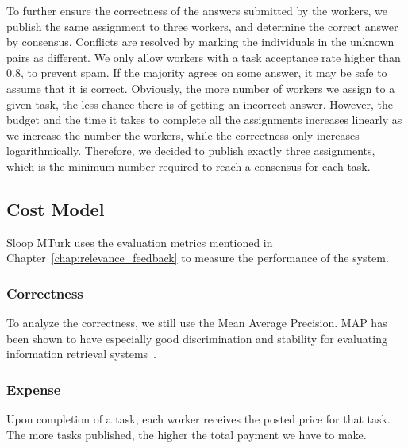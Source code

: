 To further ensure the correctness of the answers submitted by the workers, we
publish the same assignment to three workers, and determine the correct answer
by consensus. Conflicts are resolved by marking the individuals in the unknown
pairs as different. We only allow workers with a task acceptance rate higher than
0.8, to prevent spam. If the majority agrees on some answer, it may be safe to
assume that it is correct. Obviously, the more number of workers we assign to a
given task, the less chance there is of getting an incorrect answer. However,
the budget and the time it takes to complete all the assignments increases
linearly as we increase the number the workers, while the
correctness only increases logarithmically. Therefore, we decided to publish
exactly three assignments, which is the minimum number required to reach a consensus
for each task.

\subsection{Cost Model}

Sloop MTurk uses the evaluation metrics mentioned in
Chapter~\ref{chap:relevance_feedback} to measure the performance of the system.

\subsubsection{Correctness}

To analyze the correctness, we still use the Mean Average Precision.  MAP has
been shown to have especially good discrimination and stability for evaluating
information retrieval
systems~\cite{manning2008introduction}.

\subsubsection{Expense}

Upon completion of a task, each worker receives the posted price for that
task. The more tasks published, the higher the total payment we have to make.
